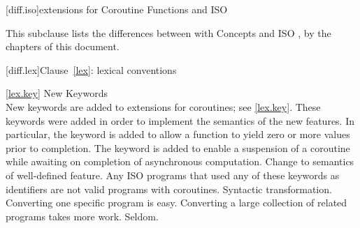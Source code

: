 
[diff.iso]{\Cpp extensions for Coroutine Functions and ISO }

\pnum
This subclause lists the differences between \Cpp with Concepts
and ISO \Cpp, by the chapters of this document.

[diff.lex]{Clause~\ref{lex}: lexical conventions}

\ref{lex.key}
\change New Keywords\\
New keywords are added to \Cpp extensions for coroutines;
see \ref{lex.key}.
\rationale
These keywords were added in order to implement the semantics of the
new features. In particular, the  keyword is added
to allow a function to yield zero or more values prior to completion. The  keyword is
added to enable a suspension of a coroutine while
awaiting on completion of asynchronous computation.
\effect
Change to semantics of well-defined feature.
Any ISO \Cpp programs that used any of these keywords as identifiers
are not valid \Cpp programs with coroutines.
\difficulty
Syntactic transformation.
Converting one specific program is easy.
Converting a large collection
of related programs takes more work.
\howwide
Seldom.

